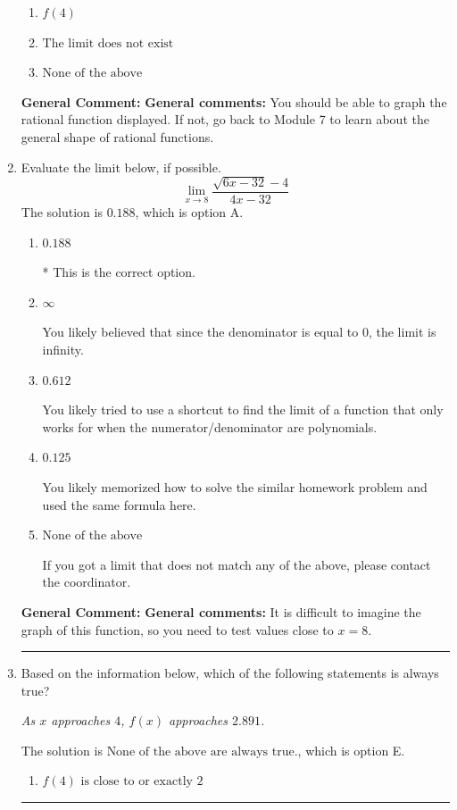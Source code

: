 \documentclass{extbook}[14pt]
\newcommand{\litem}[1]{\item #1

\rule{\textwidth}{0.4pt}}
\begin{document}
\begin{enumerate}
{\begin{enumerate}[label=\Alph*.]
\item \( f(4) \)


\item \( \text{The limit does not exist} \)


\item \( \text{None of the above} \)


\end{enumerate}

\textbf{General Comment:} \textbf{General comments:} You should be able to graph the rational function displayed. If not, go back to Module 7 to learn about the general shape of rational functions.
}
\litem{
Evaluate the limit below, if possible.
\[ \lim_{x \rightarrow 8} \frac{\sqrt{6x - 32} - 4}{4x - 32} \]The solution is \( 0.188 \), which is option A.\begin{enumerate}[label=\Alph*.]
\item \( 0.188 \)

* This is the correct option.
\item \( \infty \)

You likely believed that since the denominator is equal to 0, the limit is infinity.
\item \( 0.612 \)

You likely tried to use a shortcut to find the limit of a function that only works for when the numerator/denominator are polynomials.
\item \( 0.125 \)

You likely memorized how to solve the similar homework problem and used the same formula here.
\item \( \text{None of the above} \)

If you got a limit that does not match any of the above, please contact the coordinator.
\end{enumerate}

\textbf{General Comment:} \textbf{General comments:} It is difficult to imagine the graph of this function, so you need to test values close to $x = 8$.
}
\litem{
Based on the information below, which of the following statements is always true?

\begin{center}
    \textit{ As $x$ approaches $4$, $f(x)$ approaches $2.891$. }
\end{center}
The solution is \( \text{None of the above are always true.} \), which is option E.\begin{enumerate}[label=\Alph*.]
\item \( f(4) \text{ is close to or exactly } 2 \)



\end{enumerate}}
\end{enumerate}
\end{document}

